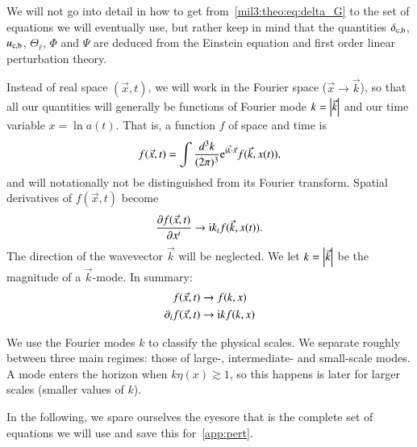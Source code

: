 We will not go into detail in how to get from~\cref{mil3:theo:eq:delta_G} to the set of equations we will eventually use, but rather keep in mind that the quantities $\delta_\mathrm{c,b}$, $u_\mathrm{c,b}$, $\Theta_\ell$, $\Phi$ and $\Psi$ are deduced from the Einstein equation and first order linear perturbation theory. 


Instead of real space $(\vec{x}, t)$, we will work in the Fourier space ($\vec{x}\to\vec{k}$), so that all our quantities will generally be functions of Fourier mode $k=\abs{\vec{k}}$ and our time variable $x = \ln{a(t)}$. That is, a function $f$ of space and time is
\begin{equation}
    f(\vec{x}, t) = \int \frac{d^3 k}{(2\pi)^3} \eu^{\im \vec{k}\cdot \vec{x}}f(\vec{k}, x(t)),
\end{equation}
and will notationally not be distinguished from its Fourier transform. Spatial derivatives of $f(\vec{x}, t)$ become
\begin{equation}
    \pdv{f(\vec{x}, t)}{x^i} \to \mathrm{i} k_i f(\vec{k}, x(t)).
\end{equation}
The direction of the wavevector $\vec{k}$ will be neglected. We let $k=\abs{\vec{k}}$ be the magnitude of a $\vec{k}$-mode. In summary:
\begin{equation}
\begin{split}
    f(\vec{x}, t) &\to f(k, x) \\
    \partial_i f(\vec{x}, t) &\to \mathrm{i} k f(k, x)
\end{split}
\end{equation}

We use the Fourier modes $k$ to classify the physical scales. We separate roughly between three main regimes: those of large-, intermediate- and small-scale modes. A mode enters the horizon when $k\eta(x) \gtrsim 1$, so this happens is later for larger scales (smaller values of $k$). 

In the following, we spare ourselves the eyesore that is the complete set of equations we will use and save this for~\cref{app:pert}.


